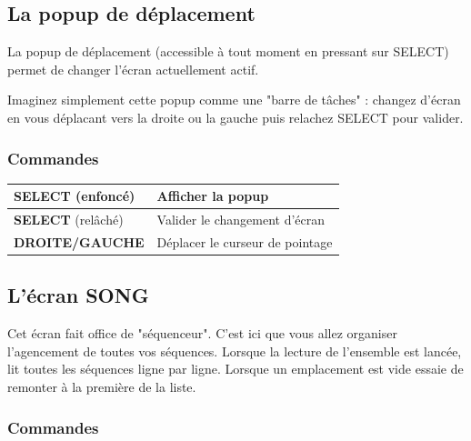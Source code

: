 \documentclass[12pt,a4paper]{article}
\begin{document}
    \subsection{La popup de déplacement}

    La popup de déplacement (accessible à tout moment en pressant sur SELECT) permet de changer l'écran actuellement actif.


    Imaginez simplement cette popup comme une "barre de tâches" : changez d'écran en vous déplacant vers la droite ou la gauche puis relachez SELECT pour valider.

        \subsubsection{Commandes}

        \tablelasttail{\hline}
        \begin{supertabular}{|l|l|}
        \hline
            {\bf SELECT} (enfoncé) & Afficher la popup \\
            \hline
            {\bf SELECT} (relâché) & Valider le changement d'écran \\
            \hline
            {\bf DROITE/GAUCHE} & Déplacer le curseur de pointage \\
        \hline
        \end{supertabular}

    \subsection{L'écran SONG}

    Cet écran fait office de "séquenceur". C'est ici que vous allez organiser l'agencement de toutes vos séquences. Lorsque la lecture de l'ensemble est lancée, \FAT lit toutes les séquences ligne par ligne. Lorsque un emplacement est vide \FAT essaie de remonter à la première de la liste.


        \subsubsection{Commandes}
\end{document}
